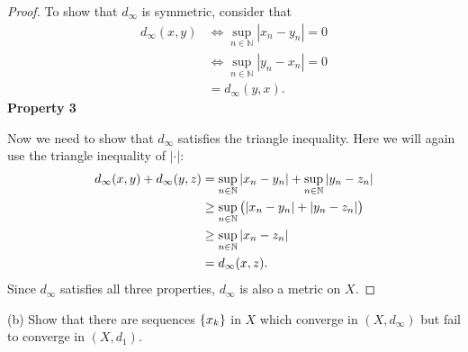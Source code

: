 \documentclass{article}
\newcommand{\N}{\mathbb{N}}
\begin{document}
\begin{proof}
To show that $d_\infty$ is symmetric, consider that
%
\begin{align*}
    d_\infty(x, y)
        &\iff \sup_{n \in \N} |x_n - y_n| = 0 \\
        &\iff \sup_{n \in \N} |y_n - x_n| = 0 \\
        &= d_\infty(y, x)
        .
\end{align*}
%
\textbf{Property 3}

Now we need to show that $d_\infty$ satisfies the triangle inequality.
Here we will again use the triangle inequality of $|\cdot|$:
%
\begin{align*}
    d_\infty(x, y) + d_\infty(y, z)
        &= \sup_{n \in \N} |x_n - y_n| + \sup_{n \in \N} |y_n - z_n| \\
        &\geq \sup_{n \in \N} \del{|x_n - y_n| + |y_n - z_n|} \\
        &\geq \sup_{n \in \N} |x_n - z_n| \\
        &= d_\infty(x, z)
        .
\end{align*}
%
Since $d_\infty$ satisfies all three properties, $d_\infty$ is also a  metric on
$X$.

\end{proof}

\newpage

(b) Show that there are sequences $\cbr{x_k}$ in $X$ which converge in
$(X, d_{\infty})$ but fail to converge in $(X, d_1)$.
\end{document}
